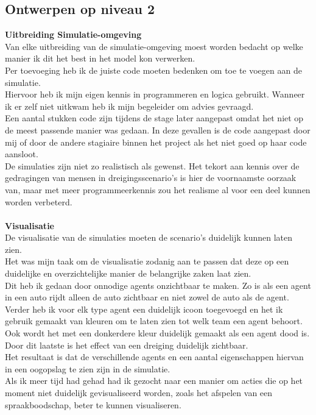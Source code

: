 \documentclass[12pt, letterpaper]{article}
\begin{document}
\begin{appendices}
\subsection{Ontwerpen op niveau 2}
\textbf{Uitbreiding Simulatie-omgeving}\\
Van elke uitbreiding van de simulatie-omgeving moest worden bedacht op welke manier ik dit het best in het model kon verwerken.\\
Per toevoeging heb ik de juiste code moeten bedenken om toe te voegen aan de simulatie.\\
Hiervoor heb ik mijn eigen kennis in programmeren en logica gebruikt. Wanneer ik er zelf niet uitkwam heb ik mijn begeleider om advies gevraagd.\\
Een aantal stukken code zijn tijdens de stage later aangepast omdat het niet op de meest passende manier was gedaan. In deze gevallen is de code aangepast door mij of door de andere stagiaire binnen het project als het niet goed op haar code aansloot.\\
De simulaties zijn niet zo realistisch als gewenst. Het tekort aan kennis over de gedragingen van mensen in dreigingsscenario's is hier de voornaamste oorzaak van, maar met meer programmeerkennis zou het realisme al voor een deel kunnen worden verbeterd.\\
\\
\textbf{Visualisatie}\\
De visualisatie van de simulaties moeten de scenario's duidelijk kunnen laten zien.\\
Het was mijn taak om de visualisatie zodanig aan te passen dat deze op een duidelijke en overzichtelijke manier de belangrijke zaken laat zien.\\
Dit heb ik gedaan door onnodige agents onzichtbaar te maken. Zo is als een agent in een auto rijdt alleen de auto zichtbaar en niet zowel de auto als de agent. Verder heb ik voor elk type agent een duidelijk icoon toegevoegd en het ik gebruik gemaakt van kleuren om te laten zien tot welk team een agent behoort. Ook wordt het met een donkerdere kleur duidelijk gemaakt als een agent dood is. Door dit laatste is het effect van een dreiging duidelijk zichtbaar.\\
Het resultaat is dat de verschillende agents en een aantal eigenschappen hiervan in een oogopslag te zien zijn in de simulatie. \\
Als ik meer tijd had gehad had ik gezocht naar een manier om acties die op het moment niet duidelijk gevisualiseerd worden, zoals het afspelen van een spraakboodschap, beter te kunnen visualiseren.


\end{appendices}
\end{document}
